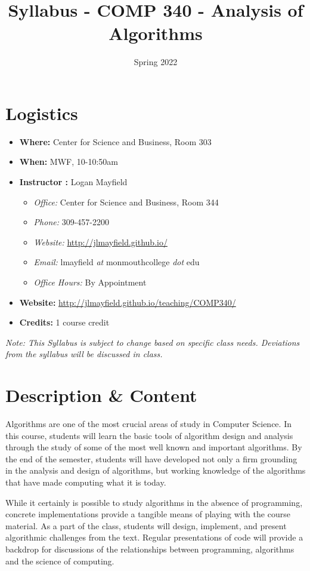 \documentclass[10pt]{article}
\title{Syllabus - COMP 340 - Analysis of Algorithms}
\author{  }
\date{ Spring 2022}
\begin{document}
\maketitle

\section{Logistics}
\begin{itemize}
\item \textbf{Where: } Center for Science and Business, Room 303
\item \textbf{When: } MWF, 10-10:50am
\item \textbf{Instructor :} Logan Mayfield
\begin{itemize}
\item \textit{Office: } Center for Science and Business, Room 344
\item \textit{Phone: } 309-457-2200
\item \textit{Website: } \url{http://jlmayfield.github.io/}
\item \textit{Email: } lmayfield \textit{at} monmouthcollege \textit{dot} edu
\item \textit{Office Hours: } By Appointment
\end{itemize}
\item \textbf{Website: } \url{http://jlmayfield.github.io/teaching/COMP340/}
\item \textbf{Credits: } 1 course credit
\end{itemize}
\emph{Note: This Syllabus is subject to change based on specific class needs. Deviations from the syllabus will be discussed in class.}

\section{Description \& Content}


Algorithms are one of the most crucial areas of study in Computer Science.  In this course, students will learn the basic tools of algorithm design and analysis through the study of some of the most well known and important algorithms.  By the end of the semester, students will have developed not only a firm grounding in the analysis and design of algorithms, but working knowledge of the algorithms that have made computing what it is today.

While it certainly is possible to study algorithms in the absence of programming, concrete implementations provide a tangible means of playing with the course material.  As a part of the class, students will design, implement, and present algorithmic challenges from the text. Regular presentations of code will provide a backdrop for discussions of the relationships between programming, algorithms and the science of computing.
\end{document}
